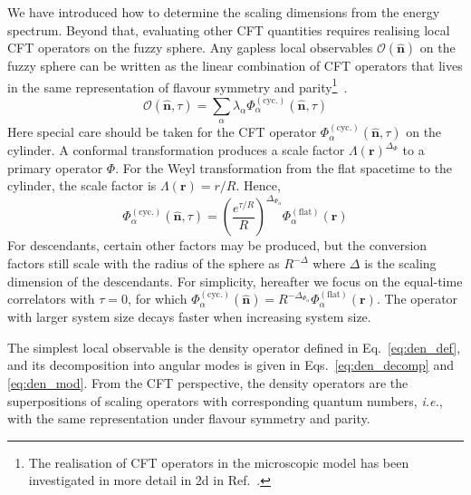 \documentclass{timesjhep}
\begin{document}
We have introduced how to determine the scaling dimensions from the energy spectrum. Beyond that, evaluating other CFT quantities requires realising local CFT operators on the fuzzy sphere. Any gapless local observables $\mathcal{O}(\hat{\mathbf{n}})$ on the fuzzy sphere can be written as the linear combination of CFT operators that lives in the same representation of flavour symmetry and parity\footnote{The realisation of CFT operators in the microscopic model has been investigated in more detail in 2d in Ref.~\cite{Zou2019Operator2d}.}~\cite{Hu2023Mar}. 
\begin{equation}
    \mathcal{O}(\hat{\mathbf{n}},\tau)=\sum_\alpha \lambda_\alpha\Phi^{(\mathrm{cyc.})}_\alpha(\hat{\mathbf{n}},\tau) 
\end{equation} 
Here special care should be taken for the CFT operator $\Phi^{(\mathrm{cyc.})}_\alpha(\hat{\mathbf{n}},\tau)$ on the cylinder. A conformal transformation produces a scale factor $\Lambda(\mathbf{r})^{\Delta_\Phi}$ to a primary operator $\Phi$. For the Weyl transformation from the flat spacetime to the cylinder, the scale factor is $\Lambda(\mathbf{r})=r/R$. Hence, 
\begin{equation}
    \Phi^{(\mathrm{cyc.})}_\alpha(\hat{\mathbf{n}},\tau)=\left(\frac{e^{\tau/R}}{R}\right)^{\Delta_{\Phi_\alpha}}\Phi_\alpha^{\mathrm{(flat)}}(\mathbf{r})
\end{equation}
For descendants, certain other factors may be produced, but the conversion factors still scale with the radius of the sphere as $R^{-\Delta}$ where $\Delta$ is the scaling dimension of the descendants. For simplicity, hereafter we focus on the equal-time correlators with $\tau=0$, for which $\Phi^{(\mathrm{cyc.})}_\alpha(\hat{\mathbf{n}})=R^{-\Delta_{\Phi_\alpha}}\Phi_\alpha^{\mathrm{(flat)}}(\mathbf{r})$. The operator with larger system size decays faster when increasing system size. 

The simplest local observable is the density operator defined in Eq.~\eqref{eq:den_def}, and its decomposition into angular modes is given in Eqs.~\eqref{eq:den_decomp} and \eqref{eq:den_mod}. From the CFT perspective, the density operators are the superpositions of scaling operators with corresponding quantum numbers, \textit{i.e.}, with the same representation under flavour symmetry and parity. 
\end{document}
